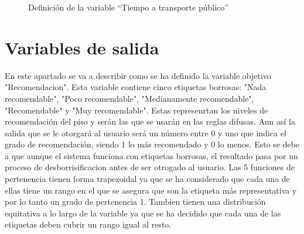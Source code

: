 \documentclass[12pt]{report} %
\begin{document}
        \begin{figure}[H]
            \centering
            \caption{Definición de la variable ``Tiempo a transporte público''}
        \end{figure}

    \section{Variables de salida}
    En este apartado se va a describir como se ha definido la variable objetivo "Recomendacion". Esta variable contiene cinco etiquetas borrosas: 
    "Nada recomendable", "Poco recomendable", "Medianamente recomendable", "Recomendable" y "Muy recomendable". Estas represenrtan los niveles de 
    recomendación del piso y serán las que se usarán en las reglas difusas. Aun así la salida que se le otorgará al usuario será un número entre 
    0 y uno que indica el grado de recomendación, siendo 1 lo más recomendado y 0 lo menos. Esto se debe a que aunque el sistema funciona con 
    etiquetas borrosas, el resultado pasa por un proceso de desborrisificacion antes de ser otrogado al usuario. Las 5 funciones de pertenencia 
    tienen forma trapezoidal ya que se ha considerado que cada una de ellas tiene un rango en el que se asegura que son la etiqueta más 
    representativa y por lo tanto un grado de pertenencia 1. Tambien tienen una distribución equitativa a lo largo de la variable ya que se ha 
    decidido que cada una de las etiquetas deben cubrir un rango igual al resto.
\end{document}
